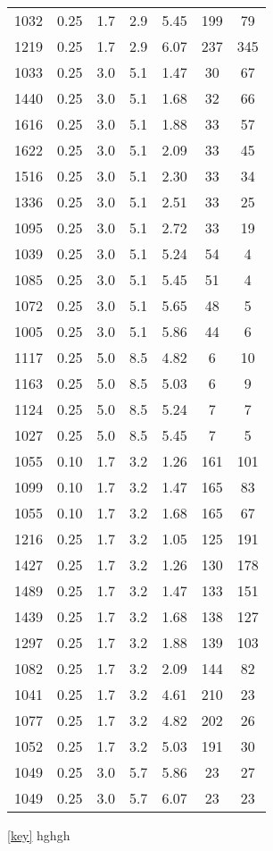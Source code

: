 \documentclass{aastex62}
\begin{document}
\begin{table}
\begin{tabular}{ccccccc}
1032 & 0.25 & 1.7 & 2.9 & 5.45 & 199 & 79 \\ 
1219 & 0.25 & 1.7 & 2.9 & 6.07 & 237 & 345 \\ 
1033 & 0.25 & 3.0 & 5.1 & 1.47 & 30 & 67 \\ 
1440 & 0.25 & 3.0 & 5.1 & 1.68 & 32 & 66 \\ 
1616 & 0.25 & 3.0 & 5.1 & 1.88 & 33 & 57 \\ 
1622 & 0.25 & 3.0 & 5.1 & 2.09 & 33 & 45 \\ 
1516 & 0.25 & 3.0 & 5.1 & 2.30 & 33 & 34 \\ 
1336 & 0.25 & 3.0 & 5.1 & 2.51 & 33 & 25 \\ 
1095 & 0.25 & 3.0 & 5.1 & 2.72 & 33 & 19 \\ 
1039 & 0.25 & 3.0 & 5.1 & 5.24 & 54 & 4 \\ 
1085 & 0.25 & 3.0 & 5.1 & 5.45 & 51 & 4 \\ 
1072 & 0.25 & 3.0 & 5.1 & 5.65 & 48 & 5 \\ 
1005 & 0.25 & 3.0 & 5.1 & 5.86 & 44 & 6 \\ 
1117 & 0.25 & 5.0 & 8.5 & 4.82 & 6 & 10 \\ 
1163 & 0.25 & 5.0 & 8.5 & 5.03 & 6 & 9 \\ 
1124 & 0.25 & 5.0 & 8.5 & 5.24 & 7 & 7 \\ 
1027 & 0.25 & 5.0 & 8.5 & 5.45 & 7 & 5 \\ 
1055 & 0.10 & 1.7 & 3.2 & 1.26 & 161 & 101 \\ 
1099 & 0.10 & 1.7 & 3.2 & 1.47 & 165 & 83 \\ 
1055 & 0.10 & 1.7 & 3.2 & 1.68 & 165 & 67 \\ 
1216 & 0.25 & 1.7 & 3.2 & 1.05 & 125 & 191 \\ 
1427 & 0.25 & 1.7 & 3.2 & 1.26 & 130 & 178 \\ 
1489 & 0.25 & 1.7 & 3.2 & 1.47 & 133 & 151 \\ 
1439 & 0.25 & 1.7 & 3.2 & 1.68 & 138 & 127 \\ 
1297 & 0.25 & 1.7 & 3.2 & 1.88 & 139 & 103 \\ 
1082 & 0.25 & 1.7 & 3.2 & 2.09 & 144 & 82 \\ 
1041 & 0.25 & 1.7 & 3.2 & 4.61 & 210 & 23 \\ 
1077 & 0.25 & 1.7 & 3.2 & 4.82 & 202 & 26 \\ 
1052 & 0.25 & 1.7 & 3.2 & 5.03 & 191 & 30 \\ 
1049 & 0.25 & 3.0 & 5.7 & 5.86 & 23 & 27 \\ 
1049 & 0.25 & 3.0 & 5.7 & 6.07 & 23 & 23 \\ 
\end{tabular}
\end{table}
\ref{key} hghgh
\end{document}
